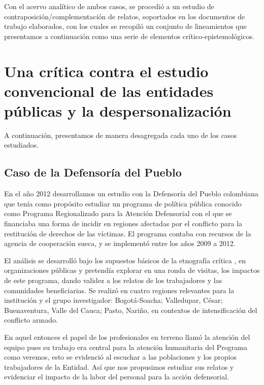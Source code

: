 \documentclass[
  spanish,
  11pt,
  a4paper,
]{scrbook}
\begin{document}
Con el acervo analítico de ambos casos, se procedió a un estudio de
contraposición/complementación de relatos, soportados en los documentos
de trabajo elaborados, con los cuales se recopiló un conjunto de
lineamientos que presentamos a continuación como una serie de elementos
crítico-epistemológicos.

\section*{Una crítica contra el estudio convencional de las entidades
públicas y la
despersonalización}\label{una-cruxedtica-contra-el-estudio-convencional-de-las-entidades-puxfablicas-y-la-despersonalizaciuxf3n}


A continuación, presentamos de manera desagregada cada uno de los casos
estudiados.

\subsection*{Caso de la Defensoría del
Pueblo}\label{caso-de-la-defensoruxeda-del-pueblo}

En el año 2012 desarrollamos un estudio con la Defensoría del Pueblo
colombiana que tenía como propósito estudiar un programa de política
pública conocido como Programa Regionalizado para la Atención
Defensorial con el que se financiaba una forma de incidir en regiones
afectadas por el conflicto para la restitución de derechos de las
víctimas. El programa contaba con recursos de la agencia de cooperación
sueca, y se implementó entre los años 2009 a 2012.

El análisis se desarrolló bajo los supuestos básicos de la etnografía
crítica
\autocite{PeraltaMartinez2009,Fine2012,Tedlock2013,Valenzuela2012}, en
organizaciones públicas y pretendía explorar en una ronda de visitas,
los impactos de este programa, dando validez a los relatos de los
trabajadores y las comunidades beneficiarias. Se realizó en cuatro
regiones relevantes para la institución y el grupo investigador:
Bogotá-Soacha; Valledupar, César; Buenaventura, Valle del Cauca; Pasto,
Nariño, en contextos de intensificación del conflicto armado.

En aquel entonces el papel de los profesionales en terreno llamó la
atención del equipo pues su trabajo era central para la atención
humanitaria del Programa como veremos, esto se evidenció al escuchar a
las poblaciones y los propios trabajadores de la Entidad. Así que nos
propusimos estudiar sus relatos y evidenciar el impacto de la labor del
personal para la acción defensorial.
\end{document}
